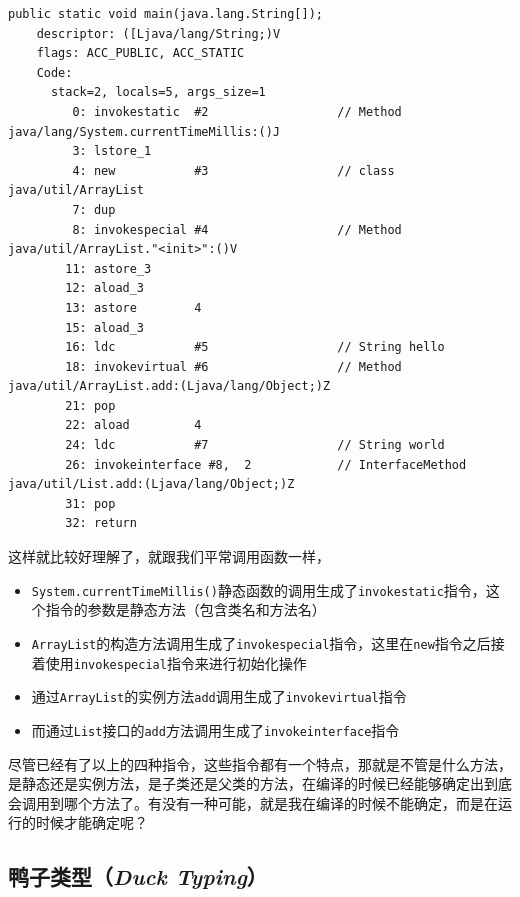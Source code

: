 \documentclass[12pt]{article}
\begin{document}
\begin{verbatim}
public static void main(java.lang.String[]);
    descriptor: ([Ljava/lang/String;)V
    flags: ACC_PUBLIC, ACC_STATIC
    Code:
      stack=2, locals=5, args_size=1
         0: invokestatic  #2                  // Method java/lang/System.currentTimeMillis:()J
         3: lstore_1
         4: new           #3                  // class java/util/ArrayList
         7: dup
         8: invokespecial #4                  // Method java/util/ArrayList."<init>":()V
        11: astore_3
        12: aload_3
        13: astore        4
        15: aload_3
        16: ldc           #5                  // String hello
        18: invokevirtual #6                  // Method java/util/ArrayList.add:(Ljava/lang/Object;)Z
        21: pop
        22: aload         4
        24: ldc           #7                  // String world
        26: invokeinterface #8,  2            // InterfaceMethod java/util/List.add:(Ljava/lang/Object;)Z
        31: pop
        32: return
\end{verbatim}

这样就比较好理解了，就跟我们平常调用函数一样，

\begin{itemize}
\tightlist
\item
  \texttt{System.currentTimeMillis()}静态函数的调用生成了\texttt{invokestatic}指令，这个指令的参数是静态方法（包含类名和方法名）
\item
  \texttt{ArrayList}的构造方法调用生成了\texttt{invokespecial}指令，这里在\texttt{new}指令之后接着使用\texttt{invokespecial}指令来进行初始化操作
\item
  通过\texttt{ArrayList}的实例方法\texttt{add}调用生成了\texttt{invokevirtual}指令
\item
  而通过\texttt{List}接口的\texttt{add}方法调用生成了\texttt{invokeinterface}指令
\end{itemize}

尽管已经有了以上的四种指令，这些指令都有一个特点，那就是不管是什么方法，是静态还是实例方法，是子类还是父类的方法，在编译的时候已经能够确定出到底会调用到哪个方法了。有没有一种可能，就是我在编译的时候不能确定，而是在运行的时候才能确定呢？

\subsection{\texorpdfstring{鸭子类型（\textbf{\emph{Duck Typing}}）}{鸭子类型（Duck Typing）}}\label{ux9e2dux5b50ux7c7bux578bduck-typing}
\end{document}
